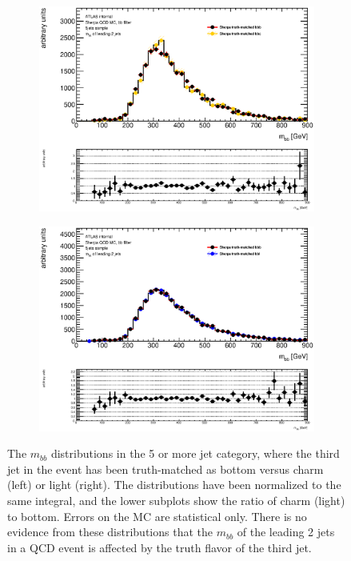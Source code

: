 \begin{figure}[phtb!]
  \begin{center}
  \begin{subfigure}[$BBB$ vs $BBC$, 5+ jet category]{0.45\textwidth}\includegraphics[width=\textwidth]{MonteCarlo/figures/mbb_bbB_5jets_bbB_bbC.eps}\end{subfigure}
  \begin{subfigure}[$BBB$ vs $BBL$, 5+ jet category]{0.45\textwidth}\includegraphics[width=\textwidth]{MonteCarlo/figures/mbb_bbB_5jets_bbB_bbL.eps}\end{subfigure}
  \caption{The $m_{bb}$ distributions in the 5 or more jet category, where the third jet in the event has been 
  truth-matched as bottom versus charm (left) or light (right).  The distributions have been normalized to 
  the same integral, and the lower subplots show the ratio of charm (light) to bottom.  Errors on the MC
  are statistical only.  There is no evidence from these distributions that the $m_{bb}$ of the leading
  2 jets in a QCD event is affected by the truth flavor of the third jet. 
  \label{fig:mbb_bb_qcd_mc}}
    \end{center}
\end{figure}
